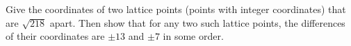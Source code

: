 Give the coordinates of two lattice points (points with integer coordinates) that are $\sqrt{218}$ apart. Then show that for any two such lattice points, the differences of their coordinates are $\pm13$ and $\pm7$ in some order.
